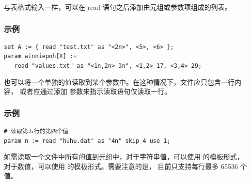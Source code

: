 \noindent 与表格式输入一样，可以在 read 语句之后添加由元组或参数项组成的列表。
\subsubsection{示例}
{\small
\begin{verbatim}
set A := { read "test.txt" as "<2n>", <5>, <6> };
param winniepoh[X] :=
   read "values.txt" as "<1n,2n> 3n", <1,2> 17, <3,4> 29;
\end{verbatim}
}


也可以将一个单独的值读取到某个参数中。在这种情况下，文件应只包含一行内容，
或者应通过添加  参数来指示读取语句仅读取一行。

\subsubsection{示例}%
{\small
\begin{verbatim}
# 读取第五行的第四个值
param n := read "huhu.dat" as "4n" skip 4 use 1;
\end{verbatim}
}

如需读取一个文件中所有的值到元组中，对于字符串值，可以使用 
的模板形式，对于数值，可以使用  的模板形式。需要注意的是，
目前只支持每行最多 65536 个值。


